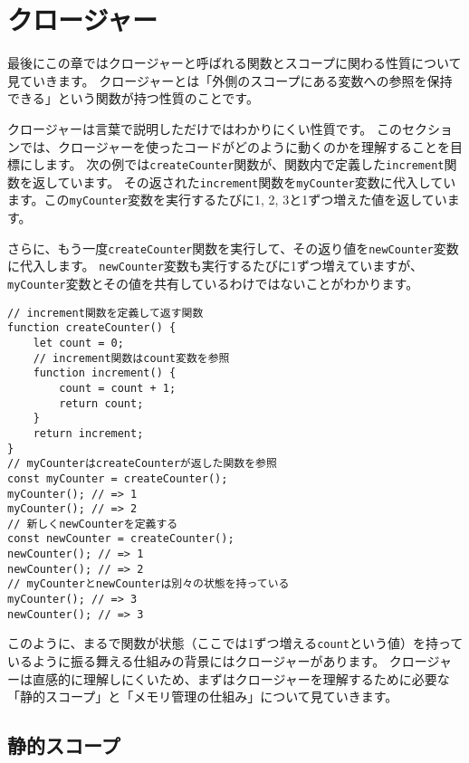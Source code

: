 \hypertarget{closure}{%
\section{クロージャー}\label{closure}}

最後にこの章ではクロージャーと呼ばれる関数とスコープに関わる性質について見ていきます。
クロージャーとは「外側のスコープにある変数への参照を保持できる」という関数が持つ性質のことです。

クロージャーは言葉で説明しただけではわかりにくい性質です。
このセクションでは、クロージャーを使ったコードがどのように動くのかを理解することを目標にします。
\newpage
次の例では\texttt{createCounter}関数が、関数内で定義した\texttt{increment}関数を返しています。
その返された\texttt{increment}関数を\texttt{myCounter}変数に代入しています。この\texttt{myCounter}変数を実行するたびに1,
2, 3と1ずつ増えた値を返しています。

さらに、もう一度\texttt{createCounter}関数を実行して、その返り値を\texttt{newCounter}変数に代入します。
\texttt{newCounter}変数も実行するたびに1ずつ増えていますが、\texttt{myCounter}変数とその値を共有しているわけではないことがわかります。

\begin{lstlisting}
// increment関数を定義して返す関数
function createCounter() {
    let count = 0;
    // increment関数はcount変数を参照
    function increment() {
        count = count + 1;
        return count;
    }
    return increment;
}
// myCounterはcreateCounterが返した関数を参照
const myCounter = createCounter();
myCounter(); // => 1
myCounter(); // => 2
// 新しくnewCounterを定義する
const newCounter = createCounter();
newCounter(); // => 1
newCounter(); // => 2
// myCounterとnewCounterは別々の状態を持っている
myCounter(); // => 3
newCounter(); // => 3
\end{lstlisting}

このように、まるで関数が状態（ここでは1ずつ増える\texttt{count}という値）を持っているように振る舞える仕組みの背景にはクロージャーがあります。
クロージャーは直感的に理解しにくいため、まずはクロージャーを理解するために必要な「静的スコープ」と「メモリ管理の仕組み」について見ていきます。

\hypertarget{static-scope}{%
\subsection{静的スコープ}\label{static-scope}}

